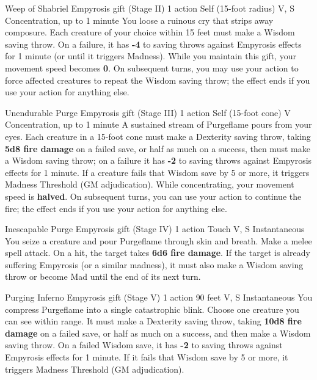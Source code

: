 \documentclass{apotheosis-book}
\begin{document}
\medskip

\DndSpellHeader%
  {Weep of Shabriel}
  {Empyrosis gift (Stage II)}
  {1 action}
  {Self (15-foot radius)}
  {V, S}
  {Concentration, up to 1 minute}
You loose a ruinous cry that strips away composure. Each creature of your choice within 15 feet must make a Wisdom saving throw. On a failure, it has \textbf{-4} to saving throws against Empyrosis effects for 1 minute (or until it triggers Madness). While you maintain this gift, your movement speed becomes \textbf{0}. On subsequent turns, you may use your action to force affected creatures to repeat the Wisdom saving throw; the effect ends if you use your action for anything else.

\DndSpellHeader%
  {Unendurable Purge}
  {Empyrosis gift (Stage III)}
  {1 action}
  {Self (15-foot cone)}
  {V}
  {Concentration, up to 1 minute}
A sustained stream of Purgeflame pours from your eyes. Each creature in a 15-foot cone must make a Dexterity saving throw, taking \textbf{5d8 fire damage} on a failed save, or half as much on a success, then must make a Wisdom saving throw; on a failure it has \textbf{-2} to saving throws against Empyrosis effects for 1 minute. If a creature fails that Wisdom save by 5 or more, it triggers Madness Threshold (GM adjudication). While concentrating, your movement speed is \textbf{halved}. On subsequent turns, you can use your action to continue the fire; the effect ends if you use your action for anything else.

\medskip

\DndSpellHeader%
  {Inescapable Purge}
  {Empyrosis gift (Stage IV)}
  {1 action}
  {Touch}
  {V, S}
  {Instantaneous}
You seize a creature and pour Purgeflame through skin and breath. Make a melee spell attack. On a hit, the target takes \textbf{6d6 fire damage}. If the target is already suffering Empyrosis (or a similar madness), it must also make a Wisdom saving throw or become Mad until the end of its next turn.

\medskip

\DndSpellHeader%
  {Purging Inferno}
  {Empyrosis gift (Stage V)}
  {1 action}
  {90 feet}
  {V, S}
  {Instantaneous}
You compress Purgeflame into a single catastrophic blink. Choose one creature you can see within range. It must make a Dexterity saving throw, taking \textbf{10d8 fire damage} on a failed save, or half as much on a success, and then make a Wisdom saving throw. On a failed Wisdom save, it has \textbf{-2} to saving throws against Empyrosis effects for 1 minute. If it fails that Wisdom save by 5 or more, it triggers Madness Threshold (GM adjudication).
\end{document}
